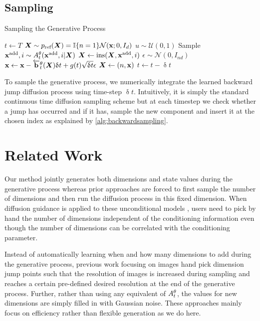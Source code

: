 \subsection{Sampling}

\begin{algorithm}
\caption{Sampling the Generative Process}
\begin{algorithmic}[1] %
\State $t \leftarrow T$
\State ${\bm{X}} \sim p_{\textup{ref}}({\bm{X}}) = \mathbb{I}\{ n=1\} \mathcal{N}({\mathbf{x}}; 0, I_{d})$
    \State $u \sim \mathcal{U}(0, 1)$
        \State Sample ${\mathbf{x}}^{\textup{add}}, i \sim A_{t}^\theta({\mathbf{x}}^{\textup{add}}, i | {\bm{X}})$
        \State ${\bm{X}} \leftarrow \text{ins}({\bm{X}}, {\mathbf{x}}^{\textup{add}}, i)$
    \EndIf
    \State $\epsilon \sim \mathcal{N}(0, I_{nd})$
    \State ${\mathbf{x}} \leftarrow {\mathbf{x}} - \overleftarrow{\mathbf{b}}_{t}^\theta({\bm{X}}) \updelta t + g(t) \sqrt{\updelta t} \epsilon$
    \State ${\bm{X}} \leftarrow (n, {\mathbf{x}})$
    \State $t \leftarrow t - \updelta t$
\EndWhile
\end{algorithmic}
\label{alg:backwardsampling}
\end{algorithm}
To sample the generative process, we numerically integrate the learned backward jump diffusion process using time-step  $\updelta t$. Intuitively, it is simply the standard continuous time diffusion sampling scheme \cite{song2020score} but at each timestep we check whether a jump has occurred and if it has, sample the new component and insert it at the chosen index as explained by \cref{alg:backwardsampling}.


\section{Related Work}

Our method jointly generates both dimensions and state values during the generative process whereas prior approaches \cite{hoogeboom2022equivariant, igashov2022equivariant} are forced to first sample the number of dimensions and then run the diffusion process in this fixed dimension. When diffusion guidance is applied to these unconditional models \cite{weiss2023guided, zhang2023towards}, users need to pick by hand the number of dimensions independent of the conditioning information even though the number of dimensions can be correlated with the conditioning parameter.

Instead of automatically learning when and how many dimensions to add during the generative process, previous work focusing on images \cite{jing2022subspace, zhang2022dimensionality} hand pick dimension jump points such that the resolution of images is increased during sampling and reaches a certain pre-defined desired resolution at the end of the generative process. Further, rather than using any equivalent of $A_t^\theta$, the values for new dimensions are simply filled in with Gaussian noise. These approaches mainly focus on efficiency rather than flexible generation as we do here.



